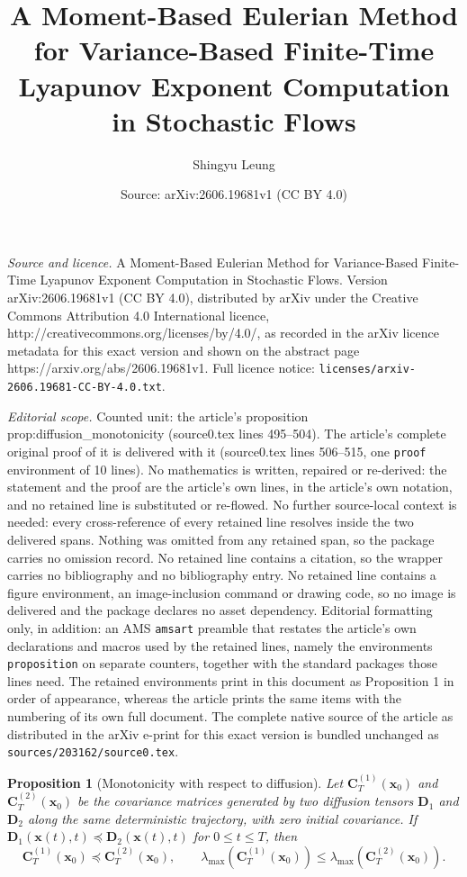 \documentclass[10pt,a4paper]{amsart}
\title{A Moment-Based Eulerian Method for Variance-Based Finite-Time Lyapunov Exponent Computation in Stochastic Flows}
\author{Shingyu Leung}
\date{Source: arXiv:2606.19681v1 (CC BY 4.0)}
\newtheorem{proposition}{Proposition}
\newcommand{\bC}{\mathbf{C}}
\newcommand{\bD}{\mathbf{D}}
\newcommand{\bx}{\mathbf{x}}
\newcommand{\lmax}{\lambda_{\max}}
\begin{document}
\maketitle

\noindent\emph{Source and licence.} A Moment-Based Eulerian Method for Variance-Based Finite-Time Lyapunov Exponent Computation in Stochastic Flows. Version arXiv:2606.19681v1 (CC BY 4.0), distributed by arXiv under the Creative Commons Attribution 4.0 International licence, http://creativecommons.org/licenses/by/4.0/, as recorded in the arXiv licence metadata for this exact version and shown on the abstract page https://arxiv.org/abs/2606.19681v1. Full licence notice: \texttt{licenses/arxiv-2606.19681-CC-BY-4.0.txt}.\par\smallskip

\noindent\textit{Editorial scope.} Counted unit: the article's proposition prop:diffusion\_monotonicity (source0.tex lines 495--504). The article's complete original proof of it is delivered with it (source0.tex lines 506--515, one \texttt{proof} environment of 10 lines). No mathematics is written, repaired or re-derived: the statement and the proof are the article's own lines, in the article's own notation, and no retained line is substituted or re-flowed.  No further source-local context is needed: every cross-reference of every retained line resolves inside the two delivered spans.  Nothing was omitted from any retained span, so the package carries no omission record.  No retained line contains a citation, so the wrapper carries no bibliography and no bibliography entry.  No retained line contains a figure environment, an image-inclusion command or drawing code, so no image is delivered and the package declares no asset dependency.  Editorial formatting only, in addition: an AMS \texttt{amsart} preamble that restates the article's own declarations and macros used by the retained lines, namely the environments \texttt{proposition} on separate counters, together with the standard packages those lines need.  The retained environments print in this document as Proposition 1 in order of appearance, whereas the article prints the same items with the numbering of its own full document.  The complete native source of the article as distributed in the arXiv e-print for this exact version is bundled unchanged as \texttt{sources/203162/source0.tex}.
\begin{proposition}[Monotonicity with respect to diffusion]\label{prop:diffusion_monotonicity}
Let \(\bC_T^{(1)}(\bx_0)\) and \(\bC_T^{(2)}(\bx_0)\) be the covariance matrices generated by two diffusion tensors \(\bD_1\) and \(\bD_2\) along the same deterministic trajectory, with zero initial covariance.  If \(\bD_1(\bx(t),t)\preceq \bD_2(\bx(t),t)\) for \(0\leq t\leq T\), then
\[
    \bC_T^{(1)}(\bx_0)\preceq \bC_T^{(2)}(\bx_0),
    \qquad
    \lmax\!\left(\bC_T^{(1)}(\bx_0)\right)
    \leq
    \lmax\!\left(\bC_T^{(2)}(\bx_0)\right).
\]
\end{proposition}
\end{document}
